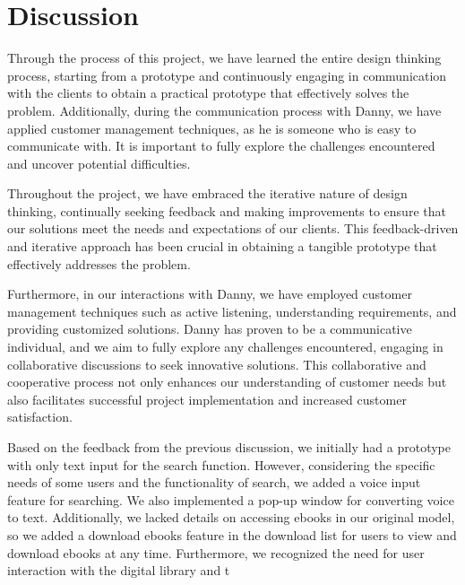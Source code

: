 \chapter{Discussion}

Through the process of this project, we have learned the entire design thinking process, starting from a prototype and continuously engaging in communication with the clients to obtain a practical prototype that effectively solves the problem. Additionally, during the communication process with Danny, we have applied customer management techniques, as he is someone who is easy to communicate with. It is important to fully explore the challenges encountered and uncover potential difficulties.

Throughout the project, we have embraced the iterative nature of design thinking, continually seeking feedback and making improvements to ensure that our solutions meet the needs and expectations of our clients. This feedback-driven and iterative approach has been crucial in obtaining a tangible prototype that effectively addresses the problem.

Furthermore, in our interactions with Danny, we have employed customer management techniques such as active listening, understanding requirements, and providing customized solutions. Danny has proven to be a communicative individual, and we aim to fully explore any challenges encountered, engaging in collaborative discussions to seek innovative solutions. This collaborative and cooperative process not only enhances our understanding of customer needs but also facilitates successful project implementation and increased customer satisfaction.

Based on the feedback from the previous discussion, we initially had a prototype with only text input for the search function. However, considering the specific needs of some users and the functionality of search, we added a voice input feature for searching. We also implemented a pop-up window for converting voice to text. Additionally, we lacked details on accessing ebooks in our original model, so we added a download ebooks feature in the download list for users to view and download ebooks at any time. Furthermore, we recognized the need for user interaction with the digital library and t